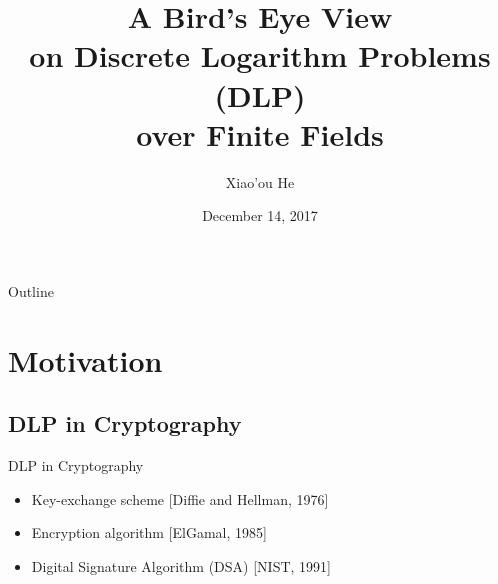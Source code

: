 \documentclass{beamer}
\title[Short Paper Title]
{A Bird's Eye View\\on Discrete Logarithm Problems (DLP)\\over Finite Fields}
\author[He]
{Xiao'ou He}
\institute[Universities of Somewhere and Elsewhere]
{Key Laboratory of Mathematics Mechanization, AMSS}
\date[Annual 2017]
{December 14, 2017}
\begin{document}

%

\begin{frame}
  \titlepage
\end{frame}

\begin{frame}{Outline}
  \tableofcontents[pausesections]
\end{frame}

\section{Motivation}

	\subsection{DLP in Cryptography}
		\begin{frame}{DLP in Cryptography}
			\begin{itemize}
				\item
					Key-exchange scheme [Diffie and Hellman, 1976]
					\pause
				\item
					Encryption algorithm [ElGamal, 1985]
					\pause
				\item
					Digital Signature Algorithm (DSA) [NIST, 1991]
			\end{itemize}
		\end{frame}
\end{document}
